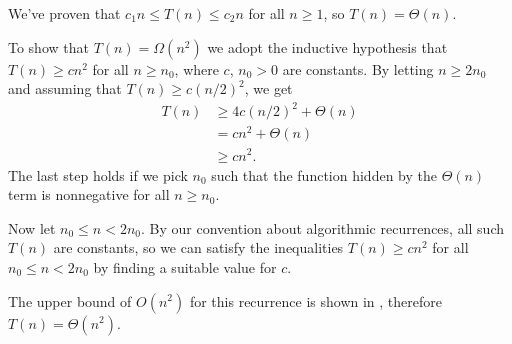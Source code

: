 We've proven that $c_1n\le T(n)\le c_2n$ for all $n\ge1$, so $T(n)=\Theta(n)$.

\subexercise
To show that $T(n)=\Omega(n^2)$ we adopt the inductive hypothesis that $T(n)\ge cn^2$ for all $n\ge n_0$, where $c$, $n_0>0$ are constants.
By letting $n\ge2n_0$ and assuming that $T(n)\ge c(n/2)^2$, we get
\begin{align*}
    T(n) &\ge 4c(n/2)^2+\Theta(n) \\
    &= cn^2+\Theta(n) \\
    &\ge cn^2.
\end{align*}
The last step holds if we pick $n_0$ such that the function hidden by the $\Theta(n)$ term is nonnegative for all $n\ge n_0$.

Now let $n_0\le n<2n_0$.
By our convention about algorithmic recurrences, all such $T(n)$ are constants, so we can satisfy the inequalities $T(n)\ge cn^2$ for all $n_0\le n<2n_0$ by finding a suitable value for $c$.

The upper bound of $O(n^2)$ for this recurrence is shown in , therefore $T(n)=\Theta(n^2)$.

